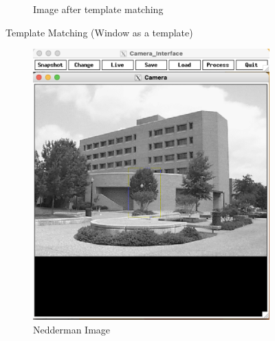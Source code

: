 \documentclass[12pt]{article}
\begin{document}
\begin{figure}
\begin{subfigure}[b]{0.475\textwidth}
		\caption[]%
		{{\small Image after template matching}}    
		\label{fig:ned_result}
	\end{subfigure}
	\caption[ ]
	{\small Template Matching (Window as a template)} 
	\label{fig:ned_temp}
\end{figure}

\begin{figure}
	\centering
	\begin{subfigure}[b]{0.475\textwidth}
		\centering
		\includegraphics[width=\textwidth]{hw3_results/nedderman_tree_select}
		\caption[]%
		{{\small Nedderman Image}}    
		\label{fig:ned2}
	\end{subfigure}
	\hfill
	\begin{subfigure}[b]{0.475\textwidth}  
		\centering 

\end{subfigure}
\end{figure}
\end{document}
